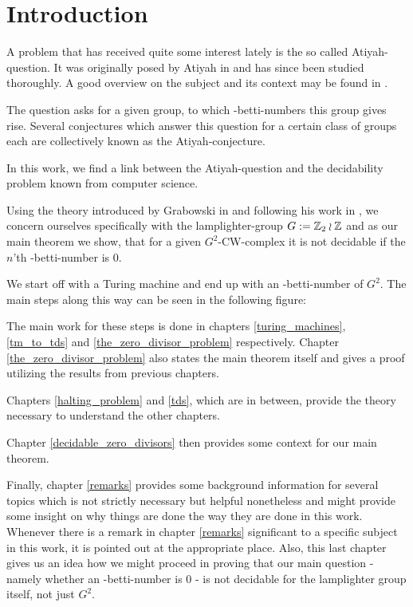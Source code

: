 \section{Introduction}

A problem that has received quite some interest lately is the so called Atiyah-question.
It was originally posed by Atiyah in \cite{ati76} and has since been studied thoroughly.
A good overview on the subject and its context may be found in \cite{luc02}.

The question asks for a given group, to which \ltwo-betti-numbers this group gives rise.
Several conjectures which answer this question for a certain class of groups each are collectively known as the Atiyah-conjecture.

In this work, we find a link between the Atiyah-question and the decidability problem known from computer science.

Using the theory introduced by Grabowski in \cite{gra14} and following his work in \cite{gra14-2}, we concern ourselves specifically with the lamplighter-group $G := \mathbb{Z}_2 \wr \mathbb{Z}$ and as our main theorem we show, that for a given $G^2$-CW-complex it is not decidable if the $n$'th \ltwo-betti-number is $0$.

We start off with a Turing machine and end up with an \ltwo-betti-number of $G^2$.
The main steps along this way can be seen in the following figure:
\begin{figure}[H]
	\centering
	
\end{figure}
The main work for these steps is done in chapters \ref{turing_machines}, \ref{tm_to_tds} and \ref{the_zero_divisor_problem} respectively.
Chapter \ref{the_zero_divisor_problem} also states the main theorem itself and gives a proof utilizing the results from previous chapters.

Chapters \ref{halting_problem} and \ref{tds}, which are in between, provide the theory necessary to understand the other chapters.

Chapter \ref{decidable_zero_divisors} then provides some context for our main theorem.

Finally, chapter \ref{remarks} provides some background information for several topics which is not strictly necessary but helpful nonetheless and might provide some insight on why things are done the way they are done in this work.
Whenever there is a remark in chapter \ref{remarks} significant to a specific subject in this work, it is pointed out at the appropriate place.
Also, this last chapter gives us an idea how we might proceed in proving that our main question - namely whether an \ltwo-betti-number is $0$ - is not decidable for the lamplighter group itself, not just $G^2$.

